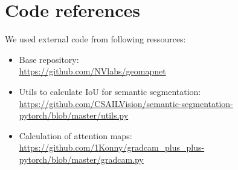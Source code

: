\documentclass[10pt,twocolumn,letterpaper]{article}
\begin{document}
\section*{Code references}
We used external code from following ressources:
\begin{itemize}[nosep,topsep=1pt]
\item 
Base repository:\\
\url{https://github.com/NVlabs/geomapnet}
\item 
Utils to calculate IoU for semantic segmentation:\\
\url{https://github.com/CSAILVision/semantic-segmentation-pytorch/blob/master/utils.py}
\item 
Calculation of attention maps:\\
\url{https://github.com/1Konny/gradcam_plus_plus-pytorch/blob/master/gradcam.py}
\end{itemize}
%
%
%
%
%
%
%
\end{document}
